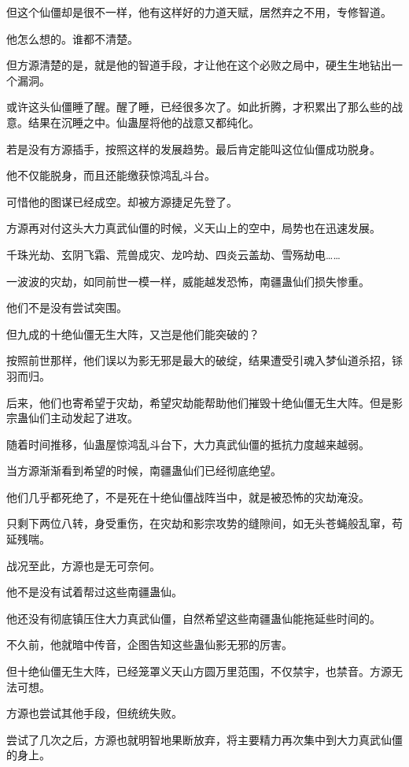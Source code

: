 \begin{this_body}
但这个仙僵却是很不一样，他有这样好的力道天赋，居然弃之不用，专修智道。

他怎么想的。谁都不清楚。

但方源清楚的是，就是他的智道手段，才让他在这个必败之局中，硬生生地钻出一个漏洞。

或许这头仙僵睡了醒。醒了睡，已经很多次了。如此折腾，才积累出了那么些的战意。结果在沉睡之中。仙蛊屋将他的战意又都纯化。

若是没有方源插手，按照这样的发展趋势。最后肯定能叫这位仙僵成功脱身。

他不仅能脱身，而且还能缴获惊鸿乱斗台。

可惜他的图谋已经成空。却被方源捷足先登了。

方源再对付这头大力真武仙僵的时候，义天山上的空中，局势也在迅速发展。

千珠光劫、玄阴飞霜、荒兽成灾、龙吟劫、四炎云盖劫、雪殇劫电……

一波波的灾劫，如同前世一模一样，威能越发恐怖，南疆蛊仙们损失惨重。

他们不是没有尝试突围。

但九成的十绝仙僵无生大阵，又岂是他们能突破的？

按照前世那样，他们误以为影无邪是最大的破绽，结果遭受引魂入梦仙道杀招，铩羽而归。

后来，他们也寄希望于灾劫，希望灾劫能帮助他们摧毁十绝仙僵无生大阵。但是影宗蛊仙们主动发起了进攻。

随着时间推移，仙蛊屋惊鸿乱斗台下，大力真武仙僵的抵抗力度越来越弱。

当方源渐渐看到希望的时候，南疆蛊仙们已经彻底绝望。

他们几乎都死绝了，不是死在十绝仙僵战阵当中，就是被恐怖的灾劫淹没。

只剩下两位八转，身受重伤，在灾劫和影宗攻势的缝隙间，如无头苍蝇般乱窜，苟延残喘。

战况至此，方源也是无可奈何。

他不是没有试着帮过这些南疆蛊仙。

他还没有彻底镇压住大力真武仙僵，自然希望这些南疆蛊仙能拖延些时间的。

不久前，他就暗中传音，企图告知这些蛊仙影无邪的厉害。

但十绝仙僵无生大阵，已经笼罩义天山方圆万里范围，不仅禁宇，也禁音。方源无法可想。

方源也尝试其他手段，但统统失败。

尝试了几次之后，方源也就明智地果断放弃，将主要精力再次集中到大力真武仙僵的身上。


\end{this_body}
